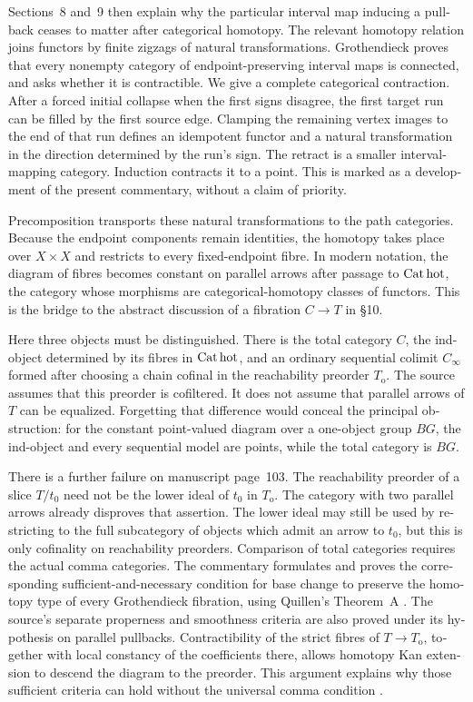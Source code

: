 \begin{otherlanguage}{english}
Sections~8 and~9 then explain why the particular interval map inducing a pullback ceases to matter after categorical homotopy.  The relevant homotopy relation joins functors by finite zigzags of natural transformations.  Grothendieck proves that every nonempty category of endpoint-preserving interval maps is connected, and asks whether it is contractible.  We give a complete categorical contraction.  After a forced initial collapse when the first signs disagree, the first target run can be filled by the first source edge.  Clamping the remaining vertex images to the end of that run defines an idempotent functor and a natural transformation in the direction determined by the run's sign.  The retract is a smaller interval-mapping category.  Induction contracts it to a point.  This is marked as a development of the present commentary, without a claim of priority.

Precomposition transports these natural transformations to the path categories.  Because the endpoint components remain identities, the homotopy takes place over $X\times X$ and restricts to every fixed-endpoint fibre.  In modern notation, the diagram of fibres becomes constant on parallel arrows after passage to $\mathrm{Cat\,hot}$, the category whose morphisms are categorical-homotopy classes of functors.  This is the bridge to the abstract discussion of a fibration $C\to T$ in \S10.

Here three objects must be distinguished.  There is the total category $C$, the ind-object determined by its fibres in $\mathrm{Cat\,hot}$, and an ordinary sequential colimit $C_\infty$ formed after choosing a chain cofinal in the reachability preorder $T_{\mathrm o}$.  The source assumes that this preorder is cofiltered.  It does not assume that parallel arrows of $T$ can be equalized.  Forgetting that difference would conceal the principal obstruction: for the constant point-valued diagram over a one-object group $BG$, the ind-object and every sequential model are points, while the total category is $BG$.

There is a further failure on manuscript page~103.  The reachability preorder of a slice $T/t_0$ need not be the lower ideal of $t_0$ in $T_{\mathrm o}$.  The category with two parallel arrows already disproves that assertion.  The lower ideal may still be used by restricting to the full subcategory of objects which admit an arrow to $t_0$, but this is only cofinality on reachability preorders.  Comparison of total categories requires the actual comma categories.  The commentary formulates and proves the corresponding sufficient-and-necessary condition for base change to preserve the homotopy type of every Grothendieck fibration, using Quillen's Theorem~A \citep[\S1]{Quillen1973}.  The source's separate properness and smoothness criteria are also proved under its hypothesis on parallel pullbacks.  Contractibility of the strict fibres of $T\to T_{\mathrm o}$, together with local constancy of the coefficients there, allows homotopy Kan extension to descend the diagram to the preorder.  This argument explains why those sufficient criteria can hold without the universal comma condition \citep{Maltsiniotis2005Asphericite,Cisinski2009LocallyConstant}.


\end{otherlanguage}
